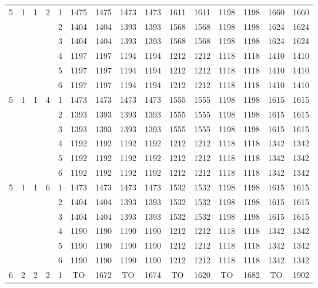 \begin{longtable}{|c|c|c|c|c|c c|c c|c c|c c|c c|}
\hline
\multirow{6}{*}{5} & \multirow{6}{*}{1} & \multirow{6}{*}{1} & \multirow{6}{*}{2} & 1 & 1475 & 1475 & 1473 & 1473 & 1611 & 1611 & 1198 & 1198 & 1660 & 1660 \\
 & & & & 2 & 1404 & 1404 & 1393 & 1393 & 1568 & 1568 & 1198 & 1198 & 1624 & 1624 \\
 & & & & 3 & 1404 & 1404 & 1393 & 1393 & 1568 & 1568 & 1198 & 1198 & 1624 & 1624 \\
 & & & & 4 & 1197 & 1197 & 1194 & 1194 & 1212 & 1212 & 1118 & 1118 & 1410 & 1410 \\
 & & & & 5 & 1197 & 1197 & 1194 & 1194 & 1212 & 1212 & 1118 & 1118 & 1410 & 1410 \\
 & & & & 6 & 1197 & 1197 & 1194 & 1194 & 1212 & 1212 & 1118 & 1118 & 1410 & 1410 \\
\hline
\multirow{6}{*}{5} & \multirow{6}{*}{1} & \multirow{6}{*}{1} & \multirow{6}{*}{4} & 1 & 1473 & 1473 & 1473 & 1473 & 1555 & 1555 & 1198 & 1198 & 1615 & 1615 \\
 & & & & 2 & 1393 & 1393 & 1393 & 1393 & 1555 & 1555 & 1198 & 1198 & 1615 & 1615 \\
 & & & & 3 & 1393 & 1393 & 1393 & 1393 & 1555 & 1555 & 1198 & 1198 & 1615 & 1615 \\
 & & & & 4 & 1192 & 1192 & 1192 & 1192 & 1212 & 1212 & 1118 & 1118 & 1342 & 1342 \\
 & & & & 5 & 1192 & 1192 & 1192 & 1192 & 1212 & 1212 & 1118 & 1118 & 1342 & 1342 \\
 & & & & 6 & 1192 & 1192 & 1192 & 1192 & 1212 & 1212 & 1118 & 1118 & 1342 & 1342 \\
\hline
\multirow{6}{*}{5} & \multirow{6}{*}{1} & \multirow{6}{*}{1} & \multirow{6}{*}{6} & 1 & 1473 & 1473 & 1473 & 1473 & 1532 & 1532 & 1198 & 1198 & 1615 & 1615 \\
 & & & & 2 & 1404 & 1404 & 1393 & 1393 & 1532 & 1532 & 1198 & 1198 & 1615 & 1615 \\
 & & & & 3 & 1404 & 1404 & 1393 & 1393 & 1532 & 1532 & 1198 & 1198 & 1615 & 1615 \\
 & & & & 4 & 1190 & 1190 & 1190 & 1190 & 1212 & 1212 & 1118 & 1118 & 1342 & 1342 \\
 & & & & 5 & 1190 & 1190 & 1190 & 1190 & 1212 & 1212 & 1118 & 1118 & 1342 & 1342 \\
 & & & & 6 & 1190 & 1190 & 1190 & 1190 & 1212 & 1212 & 1118 & 1118 & 1342 & 1342 \\
\hline
\multirow{6}{*}{6} & \multirow{6}{*}{2} & \multirow{6}{*}{2} & \multirow{6}{*}{2} & 1 & TO & 1672 & TO & 1674 & TO & 1620 & TO & 1682 & TO & 1902 \\

\end{longtable}
